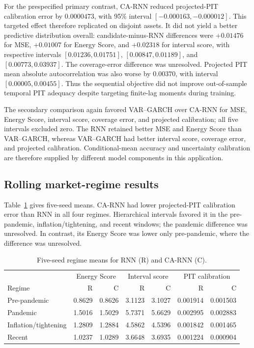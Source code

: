 \documentclass[11pt]{article}
\begin{document}
For the prespecified primary contrast, CA-RNN reduced projected-PIT
calibration error by $0.0000473$, with 95\% interval
$[-0.000163,-0.000012]$. This targeted effect therefore replicated on disjoint
assets. It did not yield a better predictive distribution overall:
candidate-minus-RNN differences were $+0.01476$ for MSE, $+0.01007$ for Energy
Score, and $+0.02318$ for interval score, with respective intervals
$[0.01236,0.01751]$, $[0.00847,0.01189]$, and $[0.00773,0.03937]$.
The coverage-error difference was unresolved. Projected PIT mean absolute
autocorrelation was also worse by $0.00370$, with interval
$[0.00005,0.00455]$. Thus the sequential objective did not improve out-of-sample
temporal PIT adequacy despite targeting finite-lag moments during training.

The secondary comparison again favored VAR--GARCH over CA-RNN for
MSE, Energy Score, interval score, coverage error, and projected calibration; all
five intervals excluded zero. The RNN retained better MSE and Energy Score than
VAR--GARCH, whereas VAR--GARCH had better interval score, coverage error, and
projected calibration. Conditional-mean accuracy and uncertainty calibration are
therefore supplied by different model components in this application.

\subsection{Rolling market-regime results}

Table~\ref{tab:regime-results} gives five-seed means. CA-RNN had lower
projected-PIT calibration error than RNN in all four regimes. Hierarchical
intervals favored it in the pre-pandemic, inflation/tightening, and recent
windows; the pandemic difference was unresolved. In contrast, its Energy Score
was lower only pre-pandemic, where the difference was unresolved.

\begin{table}[ht]
\centering
\caption{Five-seed regime means for RNN (R) and CA-RNN (C).}
\label{tab:regime-results}
\begin{tabular}{lrrrrrr}
\toprule
& \multicolumn{2}{c}{Energy Score} & \multicolumn{2}{c}{Interval score}
& \multicolumn{2}{c}{PIT calibration} \\
Regime & R & C & R & C & R & C \\
\midrule
Pre-pandemic & 0.8629 & 0.8626 & 3.1123 & 3.1027 & 0.001914 & 0.001503 \\
Pandemic & 1.5016 & 1.5029 & 5.7371 & 5.6629 & 0.002995 & 0.002883 \\
Inflation/tightening & 1.2809 & 1.2884 & 4.5862 & 4.5396 & 0.001842 & 0.001465 \\
Recent & 1.0237 & 1.0289 & 3.6648 & 3.6935 & 0.001224 & 0.000904 \\
\bottomrule
\end{tabular}
\end{table}
\end{document}

